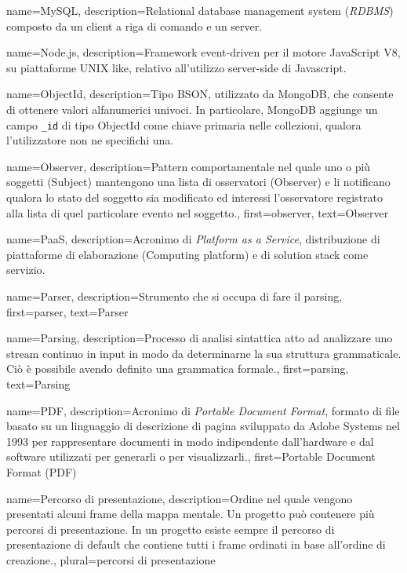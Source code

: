 {
name={MySQL},
description={Relational database management system (\textit{RDBMS}) composto da un client a riga di comando e un server.}
}

{
name={Node.js},
description={Framework event-driven per il motore JavaScript V8, su piattaforme UNIX like, relativo all'utilizzo server-side di Javascript.}
}

{
name={ObjectId},
description={Tipo BSON, utilizzato da MongoDB, che consente di ottenere valori alfanumerici univoci. In particolare, MongoDB aggiunge un campo \texttt{\_id} di tipo ObjectId come chiave primaria nelle collezioni, qualora l'utilizzatore non ne specifichi una.}
}

{
name={Observer},
description={Pattern comportamentale nel quale uno o più soggetti (Subject) mantengono una lista di osservatori (Observer) e li notificano qualora lo stato del soggetto sia modificato ed interessi l'osservatore registrato alla lista di quel particolare evento nel soggetto.},
first={observer},
text={Observer}
}

{
name={PaaS},
description={Acronimo di \textit{Platform as a Service}, distribuzione di piattaforme di elaborazione (Computing platform) e di solution stack come servizio.}
}

{
name={Parser},
description={Strumento che si occupa di fare il parsing},
first={parser},
text={Parser}
}

{
name={Parsing},
description={Processo di analisi sintattica atto ad analizzare uno stream continuo in input in modo da determinarne la sua struttura grammaticale. Ciò è possibile avendo definito una grammatica formale.},
first={parsing},
text={Parsing}
}

{
name={PDF},
description={Acronimo di \textit{Portable Document Format}, formato di file basato su un linguaggio di descrizione di pagina sviluppato da Adobe Systems nel 1993 per rappresentare documenti in modo indipendente dall'hardware e dal software utilizzati per generarli o per visualizzarli.},
first={Portable Document Format (PDF)}
}

{
name={Percorso di presentazione},
description={Ordine nel quale vengono presentati alcuni frame della mappa mentale. Un progetto può contenere più percorsi di presentazione. In un progetto esiste sempre il percorso di presentazione di default che contiene tutti i frame ordinati in base all’ordine di creazione.},
plural={percorsi di presentazione}
}

